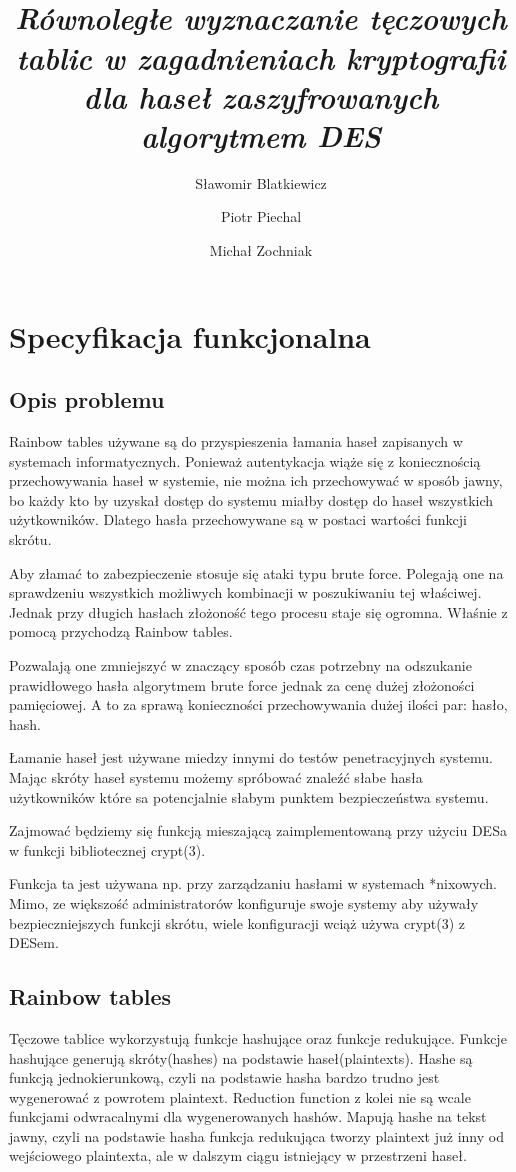 \documentclass[a4paper,11pt]{article}
\title{ \sc{Programowanie Równoległe i Rozproszone} \\
\emph{Równoległe wyznaczanie tęczowych tablic w zagadnieniach kryptografii dla haseł zaszyfrowanych algorytmem DES} }
\author{Sławomir Blatkiewicz
\and Piotr Piechal
\and Michał Zochniak}
\begin{document}
\maketitle
\tableofcontents

\section{Specyfikacja funkcjonalna}

\subsection{Opis problemu}
Rainbow tables używane są do przyspieszenia łamania haseł zapisanych w systemach informatycznych. Ponieważ autentykacja wiąże się z koniecznością przechowywania haseł w systemie, nie można ich przechowywać w sposób jawny, bo każdy kto by uzyskał dostęp do systemu miałby dostęp do haseł wszystkich użytkowników. Dlatego hasła przechowywane są w postaci wartości funkcji skrótu.

Aby złamać to zabezpieczenie stosuje się ataki typu brute force. Polegają one na sprawdzeniu wszystkich możliwych kombinacji w poszukiwaniu tej właściwej. Jednak przy długich hasłach złożoność tego procesu staje się ogromna. Właśnie z pomocą przychodzą Rainbow tables.

Pozwalają one zmniejszyć w znaczący sposób czas potrzebny na odszukanie prawidłowego hasła algorytmem brute force jednak za cenę dużej złożoności pamięciowej. A to za sprawą konieczności przechowywania dużej ilości par: hasło, hash.

Łamanie haseł jest używane miedzy innymi do testów penetracyjnych systemu. Mając skróty haseł systemu możemy spróbować znaleźć słabe hasła użytkowników które sa potencjalnie słabym punktem bezpieczeństwa systemu.

Zajmować będziemy się funkcją mieszającą zaimplementowaną przy użyciu DESa w funkcji bibliotecznej crypt(3).

Funkcja ta jest używana np. przy zarządzaniu hasłami w systemach *nixowych. Mimo, ze większość administratorów konfiguruje swoje systemy aby używały bezpieczniejszych funkcji skrótu, wiele konfiguracji wciąż używa crypt(3) z DESem.


\subsection{Rainbow tables}
Tęczowe tablice wykorzystują funkcje hashujące oraz funkcje redukujące. Funkcje hashujące generują skróty(hashes) na podstawie haseł(plaintexts). Hashe są funkcją jednokierunkową, czyli na podstawie hasha bardzo trudno jest wygenerować z powrotem plaintext. Reduction function z kolei nie są wcale funkcjami odwracalnymi dla wygenerowanych hashów. Mapują hashe na tekst jawny, czyli na podstawie hasha funkcja redukująca tworzy plaintext już inny od wejściowego plaintexta, ale w dalszym ciągu istniejący w przestrzeni haseł. 
\end{document}

